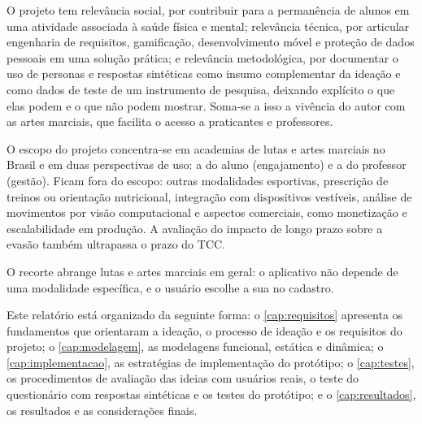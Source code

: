 O projeto tem relevância social, por contribuir para a permanência de
alunos em uma atividade associada à saúde física e mental; relevância
técnica, por articular engenharia de requisitos, gamificação,
desenvolvimento móvel e proteção de dados pessoais em uma solução
prática; e relevância metodológica, por documentar o uso de personas e
respostas sintéticas como insumo complementar da ideação e como dados de
teste de um instrumento de pesquisa, deixando explícito o que elas podem
e o que não podem mostrar. Soma-se a isso a vivência do autor
com as artes marciais, que facilita o acesso a praticantes e professores.

O escopo do projeto concentra-se em academias de lutas e artes marciais
no Brasil e em duas perspectivas de uso: a do aluno (engajamento) e a do
professor (gestão). Ficam fora do escopo: outras modalidades esportivas,
prescrição de treinos ou orientação nutricional, integração com
dispositivos vestíveis, análise de movimentos por visão computacional e
aspectos comerciais, como monetização e escalabilidade em produção. A
avaliação do impacto de longo prazo sobre a evasão também ultrapassa o
prazo do TCC.

O recorte abrange lutas e artes marciais em geral: o aplicativo não depende de
uma modalidade específica, e o usuário escolhe a sua no cadastro.

Este relatório está organizado da seguinte forma: o
\autoref{cap:requisitos} apresenta os fundamentos que orientaram a
ideação, o processo de ideação e os requisitos do projeto; o
\autoref{cap:modelagem}, as modelagens funcional, estática e dinâmica; o
\autoref{cap:implementacao}, as estratégias de implementação do
protótipo; o \autoref{cap:testes}, os procedimentos de avaliação das
ideias com usuários reais, o teste do questionário com respostas
sintéticas e os testes do protótipo; e o \autoref{cap:resultados}, os resultados e as
considerações finais.
